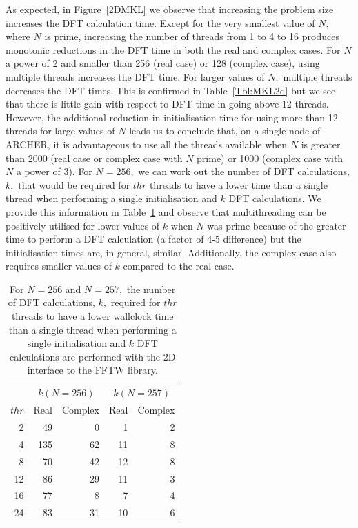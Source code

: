 \documentclass[a4paper]{article}
\begin{document}
As expected, in Figure~\ref{2DMKL} we observe that increasing the
problem size increases the DFT calculation time. Except for the very
smallest value of $N,$ where $N$ is prime, increasing the number of
threads from 1 to 4 to 16 produces monotonic reductions in the DFT
time in both the real and complex cases. For $N$ a power of 2 and
smaller than 256 (real case) or 128 (complex case), using multiple
threads increases the DFT time. For larger values of $N,$ multiple
threads decreases the DFT times. This is confirmed in
Table~\ref{Tbl:MKL2d} but we see that there is little gain with
respect to DFT time in going above 12 threads. However, the additional
reduction in initialisation time for using more than 12 threads for
large values of $N$ leads us to conclude that, on a single node of
ARCHER, it is advantageous to use all the threads available when $N$
is greater than 2000 (real case or complex case with $N$ prime) or
1000 (complex case with $N$ a power of 3). For $N=256,$ we can work
out the number of DFT calculations, $k,$ that would be required for
$thr$ threads to have a lower time than a single thread when
performing a single initialisation and $k$ DFT calculations. We
provide this information in Table~\ref{Tbl:MKL2dk} and observe that
multithreading can be positively utilised for lower values of $k$ when
$N$ was prime because of the greater time to perform a DFT calculation
(a factor of 4-5 difference) but the initialisation times are, in
general, similar. Additionally, the complex case also requires smaller
values of $k$ compared to the real case.



\begin{table}
\begin{center}
\begin{tabular}{|r||r|r||r|r|}
  \hline
 & \multicolumn{2}{|c||}{$k(N=256)$} & \multicolumn{2}{|c|}{$k(N=257)$} \\
$thr$ &  Real & Complex &  Real & Complex  \\ \hline
  2 & 49 & 0   &  1 & 2 \\
  4 & 135 & 62 & 11 & 8 \\
  8 & 70 & 42 & 12 & 8 \\
  12 & 86 & 29 & 11 & 3 \\
  16 & 77 & 8  & 7 & 4 \\
  24 & 83 & 31 &10 & 6  \\ \hline
\end{tabular}
\caption{ For $N=256$ and $N=257,$ the number of DFT calculations, $k,$ required for $thr$ threads to have a lower wallclock time than a single thread when performing  a single initialisation and $k$ DFT calculations are performed with the 2D interface to the FFTW library.  }\label{Tbl:MKL2dk}
\end{center}
\end{table}
\end{document}
